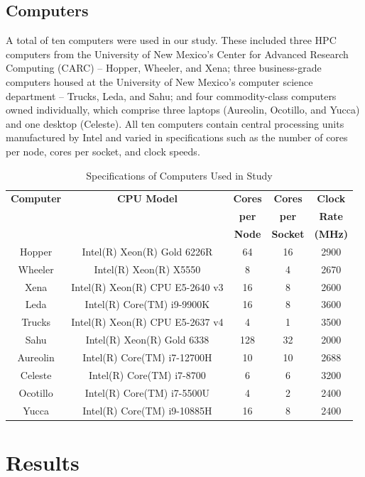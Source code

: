 \documentclass{article}
\begin{document}
\subsection{Computers}
A total of ten computers were used in our study. These included three HPC computers from the University of New Mexico's Center for Advanced Research Computing (CARC) – Hopper, Wheeler, and Xena; three business-grade computers housed at the University of New Mexico’s computer science department – Trucks, Leda, and Sahu; and four commodity-class computers owned individually, which comprise three laptops (Aureolin, Ocotillo, and Yucca) and one desktop (Celeste). All ten computers contain central processing units manufactured by Intel and varied in specifications such as the number of cores per node, cores per socket, and clock speeds.
\begin{table}[h!]
\centering
\begin{tabular}{|c|c|c|c|c|}
\hline
\textbf{Computer} & \textbf{CPU Model} & \textbf{Cores} & \textbf{Cores} & \textbf{Clock} \\
 & & \textbf{per} & \textbf{per} & \textbf{Rate} \\
 & & \textbf{Node} & \textbf{Socket} & \textbf{(MHz)} \\
\hline
Hopper & Intel(R) Xeon(R) Gold 6226R & 64 & 16 & 2900 \\
Wheeler & Intel(R) Xeon(R) X5550 & 8 & 4 & 2670 \\
Xena & Intel(R) Xeon(R) CPU E5-2640 v3 & 16 & 8 & 2600 \\
\hline
Leda & Intel(R) Core(TM) i9-9900K & 16 & 8 & 3600 \\
Trucks & Intel(R) Xeon(R) CPU E5-2637 v4 & 4 & 1 & 3500 \\
Sahu & Intel(R) Xeon(R) Gold 6338 & 128 & 32 & 2000 \\
\hline
Aureolin & Intel(R) Core(TM) i7-12700H & 10 & 10 & 2688 \\
Celeste & Intel(R) Core(TM) i7-8700 & 6 & 6 & 3200 \\
Ocotillo & Intel(R) Core(TM) i7-5500U & 4 & 2 & 2400 \\
Yucca & Intel(R) Core(TM) i9-10885H & 16 & 8 & 2400 \\
\hline
\end{tabular}
\caption{Specifications of Computers Used in Study}
\label{table:computers}
\end{table}

\section{Results}
\end{document}
